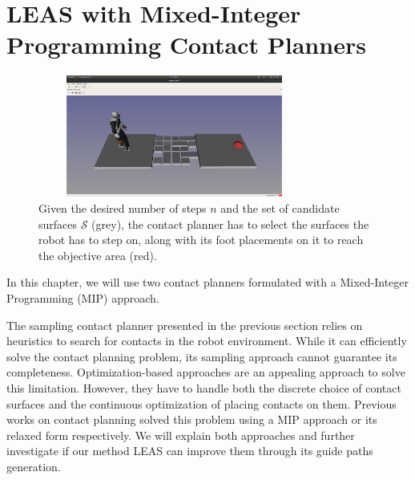 

\chapter{LEAS with Mixed-Integer Programming Contact Planners}
\label{sec:CP-SL1M}
\minitoc
\bigskip

\begin{figure}[ht]
    \centering
    \captionsetup[subfigure]{justification=centering}
    \includegraphics[trim={8cm 7cm 7.5cm 9cm},clip,width=0.8\textwidth,height=4cm]{Figures/Chapter_MIP_SL1M/rubbles/rubbles_empty.png}
    \caption{Given the desired number of steps $n$ and the set of candidate surfaces $\mathcal{S}$ (grey), the contact planner has to select the surfaces the robot has to step on, along with its foot placements on it to reach the objective area (red).\label{fig:rubbles:empty}}
\end{figure}



In this chapter, we will use two contact planners formulated with a Mixed-Integer Programming (MIP) approach.


The sampling contact planner presented in the previous section relies on heuristics to search for contacts in the robot environment.
While it can efficiently solve the contact planning problem, its sampling approach cannot guarantee its completeness.
Optimization-based approaches are an appealing approach to solve this limitation. However, they have to handle both the discrete choice of contact surfaces and the continuous optimization of placing contacts on them.
Previous works on contact planning \cite{deits2014FootPlanMI, sl1m_v2} solved this problem using a MIP approach or its relaxed form respectively.
We will explain both approaches and further investigate if our method LEAS can improve them through its guide paths generation.

